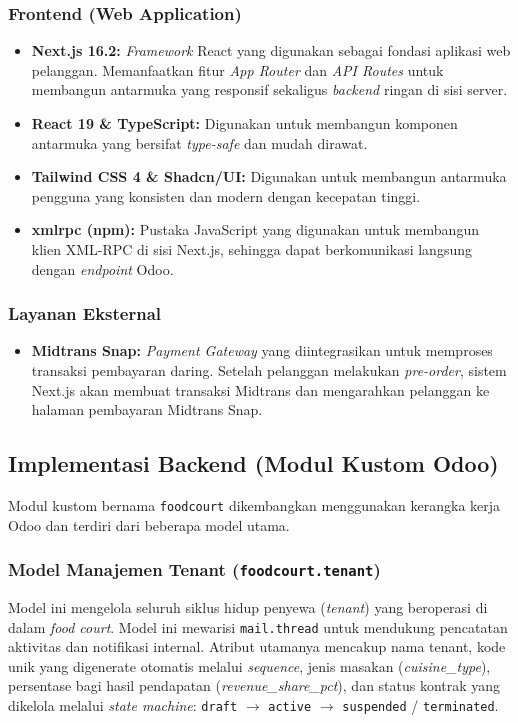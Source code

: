\documentclass[conference]{IEEEtran}
\begin{document}
\subsubsection{Frontend (Web Application)}
\begin{itemize}
    \item \textbf{Next.js 16.2:} \textit{Framework} React yang digunakan sebagai fondasi aplikasi web pelanggan. Memanfaatkan fitur \textit{App Router} dan \textit{API Routes} untuk membangun antarmuka yang responsif sekaligus \textit{backend} ringan di sisi server.
    \item \textbf{React 19 \& TypeScript:} Digunakan untuk membangun komponen antarmuka yang bersifat \textit{type-safe} dan mudah dirawat.
    \item \textbf{Tailwind CSS 4 \& Shadcn/UI:} Digunakan untuk membangun antarmuka pengguna yang konsisten dan modern dengan kecepatan tinggi.
    \item \textbf{xmlrpc (npm):} Pustaka JavaScript yang digunakan untuk membangun klien XML-RPC di sisi Next.js, sehingga dapat berkomunikasi langsung dengan \textit{endpoint} Odoo.
\end{itemize}

\subsubsection{Layanan Eksternal}
\begin{itemize}
    \item \textbf{Midtrans Snap:} \textit{Payment Gateway} yang diintegrasikan untuk memproses transaksi pembayaran daring. Setelah pelanggan melakukan \textit{pre-order}, sistem Next.js akan membuat transaksi Midtrans dan mengarahkan pelanggan ke halaman pembayaran Midtrans Snap.
\end{itemize}

\subsection{Implementasi Backend (Modul Kustom Odoo)}
Modul kustom bernama \texttt{foodcourt} dikembangkan menggunakan kerangka kerja Odoo dan terdiri dari beberapa model utama.

\subsubsection{Model Manajemen Tenant (\texttt{foodcourt.tenant})}
Model ini mengelola seluruh siklus hidup penyewa (\textit{tenant}) yang beroperasi di dalam \textit{food court}. Model ini mewarisi \texttt{mail.thread} untuk mendukung pencatatan aktivitas dan notifikasi internal. Atribut utamanya mencakup nama tenant, kode unik yang digenerate otomatis melalui \textit{sequence}, jenis masakan (\textit{cuisine\_type}), persentase bagi hasil pendapatan (\textit{revenue\_share\_pct}), dan status kontrak yang dikelola melalui \textit{state machine}: \texttt{draft} $\rightarrow$ \texttt{active} $\rightarrow$ \texttt{suspended} / \texttt{terminated}.
\end{document}
